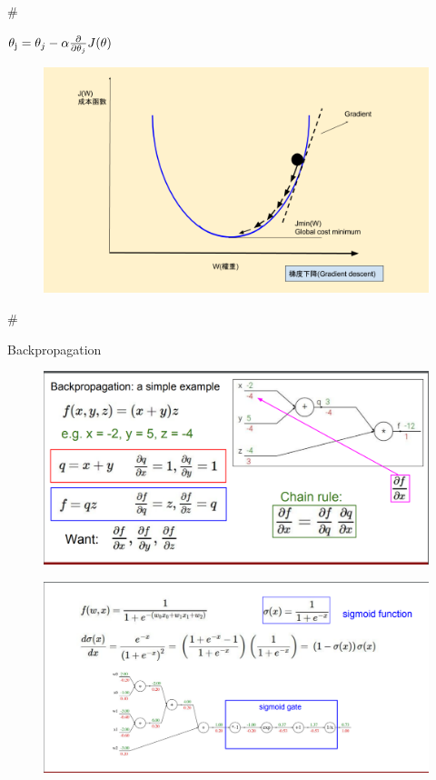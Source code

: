 \documentclass[11pt]{article}
\makeatletter
\def\maxwidth{\ifdim\Gin@nat@width>\linewidth\linewidth
    \else\Gin@nat@width\fi}
\let\Oldincludegraphics\includegraphics
\renewcommand{\includegraphics}[1]{\Oldincludegraphics[width=.8\maxwidth]{#1}}
\makeatother
\begin{document}
    \#

\({\theta _{\rm{j}}} = {\theta _j} - \alpha \frac{\partial }{{\partial {\theta _j}}}J(\theta )\)

\begin{figure}
\centering
\includegraphics{_gradient_descent.png}
\caption{}
\end{figure}

    \#

Backpropagation

\begin{figure}
\centering
\includegraphics{backprop.png}
\caption{}
\end{figure}

    \begin{figure}
\centering
\includegraphics{sigmoid_backprop.png}
\caption{}
\end{figure}
\end{document}
